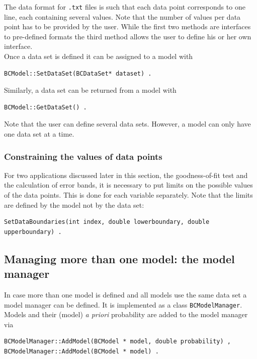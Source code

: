 \documentclass[11pt, a4paper]{article}
\begin{document}
\noindent 
The data format for \verb|.txt| files is such that each data point
corresponds to one line, each containing several values. Note that
the number of values per data point has to be provided by the
user. While the first two methods are interfaces to pre-defined
formats the third method allows the user to define his or her own
interface. \\

\noindent 
Once a data set is defined it can be assigned to a model with
%
\begin{verbatim}
BCModel::SetDataSet(BCDataSet* dataset) . 
\end{verbatim} 

\noindent 
Similarly, a data set can be returned from a model with 
%
\begin{verbatim}
BCModel::GetDataSet() . 
\end{verbatim} 

\noindent 
Note that the user can define several data sets. However, a model can
only have one data set at a time.


\subsubsection{Constraining the values of data points}

For two applications discussed later in this section, the
goodness-of-fit test and the calculation of error bands, it is
necessary to put limits on the possible values of the data
points. This is done for each variable separately. Note that the
limits are defined by the model not by the data set:
%
\begin{verbatim}
SetDataBoundaries(int index, double lowerboundary, double upperboundary) . 
\end{verbatim}


\subsection{Managing more than one model: the model manager} 

In case more than one model is defined and all models use the same
data set a model manager can be defined. It is implemented as a class
\verb|BCModelManager|. Models and their (model) {\it a priori}
probability are added to the model manager via
% 
\begin{verbatim}
BCModelManager::AddModel(BCModel * model, double probability) , 
BCModelManager::AddModel(BCModel * model) .
\end{verbatim} 
\end{document}
